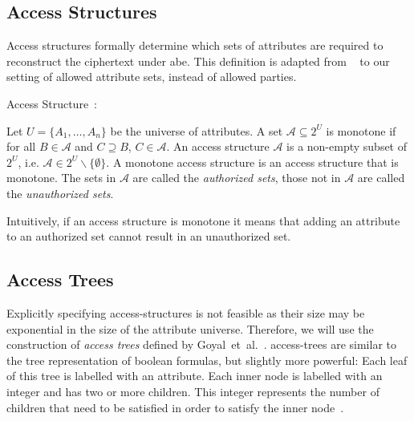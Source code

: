 
\subsection{Access Structures}\label{sec:access-structures}
Access structures formally determine which sets of attributes are required to reconstruct the ciphertext under \acrshort{abe}.
This definition is adapted from \citeauthor{beimel_secure_1996}~\cite{beimel_secure_1996} to our setting of allowed attribute sets, instead of allowed parties.
\begin{definition}Access Structure~\cite{beimel_secure_1996}:

    Let $U = \{A_1, \dots, A_n\}$ be the universe of attributes.
    A set $\mathcal{A} \subseteq 2^{U}$ is monotone if for all $B \in \mathcal{A}$ and $C \supseteq B$,  $C \in \mathcal{A}$.
    An access structure $\mathcal{A}$ is a non-empty subset of $2^U$, i.e. $\mathcal{A} \in 2^U \backslash \{\emptyset\}$.
    A monotone access structure is an access structure that is monotone.
    The sets in $\mathcal{A}$ are called the \emph{authorized sets}, those not in $\mathcal{A}$ are called the \emph{unauthorized sets}.
\end{definition}

Intuitively, if an access structure is monotone it means that adding an attribute to an authorized set cannot result in an unauthorized set. 

\subsection{Access Trees}\label{sec:access-trees}



Explicitly specifying \glspl{access-structure} is not feasible as their size may be exponential in the size of the attribute universe.
Therefore, we will use the construction of \emph{access trees} defined by Goyal~et~al.~\cite{goyal_attribute-based_2006}.
\Glspl{access-tree} are similar to the tree representation of boolean formulas, but slightly more powerful:
Each leaf of this tree is labelled with an attribute.
Each inner node is labelled with an integer and has two or more children. %
This integer represents the number of children that need to be satisfied in order to satisfy the inner node~\cite{goyal_attribute-based_2006}.

